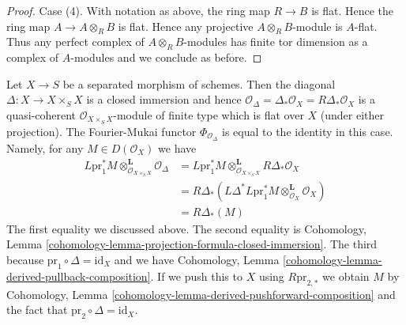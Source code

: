 \begin{proof}
\medskip\noindent
Case (4). With notation as above, the ring map $R \to B$ is flat.
Hence the ring map $A \to A \otimes_R B$ is flat. Hence any projective
$A \otimes_R B$-module is $A$-flat. Thus any perfect complex of
$A \otimes_R B$-modules has finite tor dimension as a complex
of $A$-modules and we conclude as before.
\end{proof}

\begin{example}
\label{example-diagonal-fourier-mukai}
Let $X \to S$ be a separated morphism of schemes. Then the diagonal
$\Delta : X \to X \times_S X$ is a closed immersion and hence
$\mathcal{O}_\Delta = \Delta_*\mathcal{O}_X = R\Delta_*\mathcal{O}_X$
is a quasi-coherent $\mathcal{O}_{X \times_S X}$-module of finite type
which is flat over $X$ (under either projection). The Fourier-Mukai functor
$\Phi_{\mathcal{O}_\Delta}$ is equal to the identity in this case.
Namely, for any $M \in D(\mathcal{O}_X)$ we have
\begin{align*}
L\text{pr}_1^*M \otimes_{\mathcal{O}_{X \times_S X}}^\mathbf{L}
\mathcal{O}_\Delta
& =
L\text{pr}_1^*M \otimes_{\mathcal{O}_{X \times_S X}}^\mathbf{L}
R\Delta_*\mathcal{O}_X \\
& =
R\Delta_*(
L\Delta^*L\text{pr}_1^*M \otimes_{\mathcal{O}_X}^\mathbf{L} \mathcal{O}_X) \\
& =
R\Delta_*(M)
\end{align*}
The first equality we discussed above.
The second equality is Cohomology, Lemma
\ref{cohomology-lemma-projection-formula-closed-immersion}.
The third because $\text{pr}_1 \circ \Delta = \text{id}_X$ and we have
Cohomology, Lemma \ref{cohomology-lemma-derived-pullback-composition}.
If we push this to $X$ using $R\text{pr}_{2, *}$
we obtain $M$ by
Cohomology, Lemma \ref{cohomology-lemma-derived-pushforward-composition}
and the fact that $\text{pr}_2 \circ \Delta = \text{id}_X$.
\end{example}

